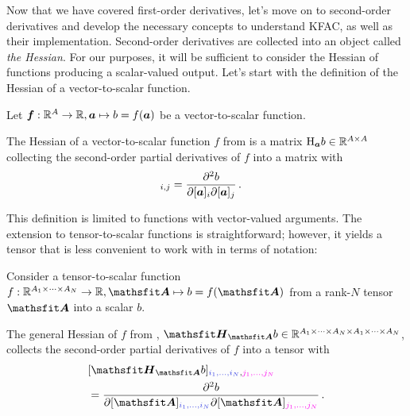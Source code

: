 Now that we have covered first-order derivatives, let's move on to second-order derivatives and develop the necessary concepts to understand KFAC, as well as their implementation.
Second-order derivatives are collected into an object called \emph{the Hessian}.
For our purposes, it will be sufficient to consider the Hessian of functions producing a scalar-valued output.
Let's start with the definition of the Hessian of a vector-to-scalar function.

\begin{setup}\label{setup:vector_to_scalar_function}
  Let ${\bm{f}}: {\mathbb{R}}^A \to {\mathbb{R}}, {\bm{a}} \mapsto b = f({\bm{a}})$ be a vector-to-scalar function.
\end{setup}

\begin{definition}\label{def:vector_hessian}
  The Hessian of a vector-to-scalar function $f$ from  is a matrix $\mathrm{H}_{{\bm{a}}}b \in {\mathbb{R}}^{A \times A}$ collecting the second-order partial derivatives of $f$ into a matrix with
  \begin{align*}
    [\hess_{\va}b]_{i,j}
     & =
    \frac{\partial^2 b}{\partial [\va]_i \partial [\va]_j}\,.
  \end{align*}
\end{definition}
This definition is limited to functions with vector-valued arguments. The extension to tensor-to-scalar functions is straightforward; however, it yields a tensor that is less convenient to work with in terms of notation:

\begin{setup}\label{setup:hessians}
  Consider a tensor-to-scalar function $f: \sR^{A_1 \times \dots \times A_N} \to \sR, \tA \mapsto b = f(\tA)$ from a rank-$N$ tensor $\tA$ into a scalar $b$.
\end{setup}

\begin{definition}\label{def:general_hessian}
  The general Hessian of $f$ from , $\tH_{\tA}b \in \sR^{A_1 \times \dots \times A_N \times A_1 \times \dots \times A_N}$, collects the second-order partial derivatives of $f$ into a tensor with
  \begin{align*}
     & [\tH_{\tA}b]_{\colored{i_1, \dots, i_N}, \colored[VectorPink]{j_1, \dots, j_N}}
    \\
     & =
    \frac{\partial^2 b}{\partial [\tA]_{\colored{i_1, \dots, i_N}} \partial [\tA]_{\colored[VectorPink]{j_1, \dots, j_N}}}\,.
  \end{align*}
\end{definition}

